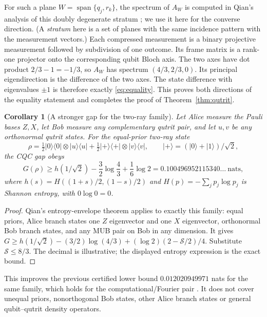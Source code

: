 \documentclass[11pt,a4paper]{article}
\numberwithin{equation}{section}
\newtheorem{corollary}[theorem]{Corollary}
\theoremstyle{remark}\newtheorem{remark}[theorem]{Remark}
\DeclareMathOperator{\spanop}{span}
\newcommand{\proj}[1]{|#1\rangle\langle #1|}
\newcommand{\ket}[1]{|#1\rangle}
\begin{document}
For such a plane $W=\spanop\{q_j,r_k\}$, the spectrum of $A_W$ is computed in Qian's analysis of this doubly degenerate stratum \cite[Section~6.5, Proposition~6.9]{qian}; we use it here for the converse direction. (A \emph{stratum} here is a set of planes with the same incidence pattern with the measurement vectors.) Each compressed measurement is a binary projective measurement followed by subdivision of one outcome. Its frame matrix is a rank-one projector onto the corresponding qubit Bloch axis. The two axes have dot product $2/3-1=-1/3$, so $A_W$ has spectrum $(4/3,2/3,0)$. Its principal eigendirection is the difference of the two axes. The state difference with eigenvalues $\pm1$ is therefore exactly \eqref{eq:equality}. This proves both directions of the equality statement and completes the proof of Theorem~\ref{thm:qutrit}.

\begin{corollary}[A stronger gap for the two-ray family]\label{cor:tworay}
Let Alice measure the Pauli bases $Z,X$, let Bob measure any complementary qutrit pair, and let $u,v$ be any orthonormal qutrit states. For the equal-prior two-ray state
\[
\rho=\tfrac12\proj{0}\otimes\proj{u}+\tfrac12\proj{+}\otimes\proj{v},
\qquad \ket{+}=(\ket0+\ket1)/\sqrt2,
\]
the CQC gap obeys
\begin{equation}
G(\rho)\ge h(1/\sqrt2)-\frac32\log\frac43+\frac16\log2
=0.100496952115340\ldots\ \text{nats},
\label{eq:tworay-gap}
\end{equation}
where $h(s)=H((1+s)/2,(1-s)/2)$ and $H(p)=-\sum_jp_j\log p_j$ is Shannon entropy, with $0\log0=0$.
\end{corollary}
\begin{proof}
Qian's entropy-envelope theorem \cite[Theorem~6.3]{qian} applies to exactly this family: equal priors, Alice branch states one $Z$ eigenvector and one $X$ eigenvector, orthonormal Bob branch states, and any MUB pair on Bob in any dimension. It gives
$G\ge h(1/\sqrt2)-(3/2)\log(4/3)+(\log2)(2-\mathcal S/2)/4$. Substitute $\mathcal S\le8/3$. The decimal is illustrative; the displayed entropy expression is the exact bound.
\end{proof}
This improves the previous certified lower bound $0.012020949971$ nats for the same family, which holds for the computational/Fourier pair \cite[Corollary~6.11]{qian}. It does not cover unequal priors, nonorthogonal Bob states, other Alice branch states or general qubit--qutrit density operators.


\end{document}
